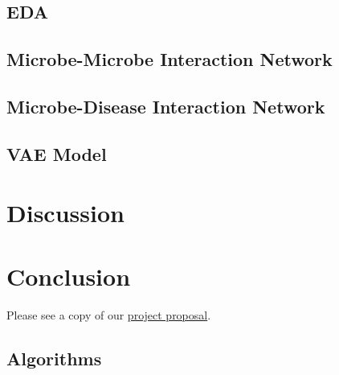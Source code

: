 \documentclass[12pt,letterpaper]{article}
\begin{document}
\subsection{EDA}

\subsection{Microbe-Microbe Interaction Network}

\subsection{Microbe-Disease Interaction Network}

\subsection{VAE Model}

\section{Discussion}

\section{Conclusion}


\clearpage
\makereference





\clearpage
\makeappendix

Please see a copy of our \href{https://drive.google.com/file/d/1fEGpmoSULPbpG6bcopPBKdlyF6gG_Gv_/view?usp=sharing}{project proposal}. 

\subsection{Algorithms}
\end{document}
